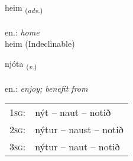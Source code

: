 \documentclass[frontgrid, backgrid]{flacards}\usepackage[]{graphicx}\usepackage[]{xcolor}
\begin{document}
\renewcommand{\blhead}{\vskip5pt {\small\bfseries\footnotesize Atviksorð | Adverb }}
\renewcommand{\bcfoot}{\vskip5pt \hspace{2pt}{\small\bfseries\footnotesize 1K}}


{heim \small{\textsubscript{(\textit{adv.})}} \\[1ex]
\textphonetic{[heiːm]} \\
en.: \emph{home} \\  [2ex]
heim (Indeclinable)}

\renewcommand{\flhead}{\vskip5pt \fboxsep=0pt {\small\bfseries\footnotesize Sagnorð | Verb}}
\renewcommand{\fcfoot}{\vskip5pt \fboxsep=0pt \hspace{2pt}{\small\bfseries\footnotesize 1K}}

\renewcommand{\blhead}{\vskip5pt {\small\bfseries\footnotesize Sagnorð | Verb }}
\renewcommand{\bcfoot}{\vskip5pt \hspace{2pt}{\small\bfseries\footnotesize 1K}}


{njóta \small{\textsubscript{(\textit{v.})}} \\[1ex] %
\textphonetic{[njouːta]} \\
en.: \emph{enjoy; benefit from} \\  [2ex]
\renewcommand*{\arraystretch}{0.8}
\begin{tabular}{p{1cm}l}
\textsc{1sg}: & nýt -- naut -- notið \\ 
\textsc{2sg}: & nýtur -- naust -- notið \\ 
\textsc{3sg}: & nýtur -- naut -- notið \\ 
\end{tabular}
}

\renewcommand{\flhead}{\vskip5pt \fboxsep=0pt {\small\bfseries\footnotesize Nafnorð | Noun}}
\renewcommand{\fcfoot}{\vskip5pt \fboxsep=0pt \hspace{2pt}{\small\bfseries\footnotesize 1K}}

\renewcommand{\blhead}{\vskip5pt {\small\bfseries\footnotesize Nafnorð | Noun }}
\renewcommand{\bcfoot}{\vskip5pt \hspace{2pt}{\small\bfseries\footnotesize 1K}}
\end{document}
